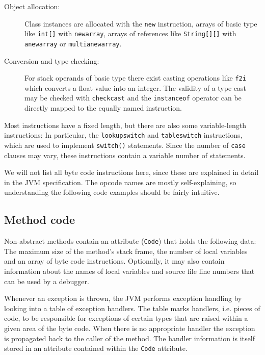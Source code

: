 \documentclass[12pt,twoside]{article}
\begin{document}
\begin{description}
\item[Object  allocation:]  Class  instances  are allocated  with  the
\texttt{new}  instruction, arrays  of basic  type  like \texttt{int[]}
with \texttt{newarray}, arrays  of references like \texttt{String[][]}
with \texttt{anewarray} or \texttt{multianewarray}.

\item[Conversion and type checking:]  For stack operands of basic type
there  exist casting  operations  like \texttt{f2i}  which converts  a
float  value into  an integer.   The validity  of a  type cast  may be
checked with  \texttt{checkcast} and the  \texttt{instanceof} operator
can be directly mapped to the equally named instruction.
\end{description}

Most  instructions  have a  fixed  length,  but  there are  also  some
variable-length instructions: In particular, the \texttt{lookupswitch}
and  \texttt{tableswitch} instructions,  which are  used  to implement
\texttt{switch()}  statements.   Since  the  number  of  \texttt{case}
clauses  may vary,  these instructions  contain a  variable  number of
statements.

We  will not list  all byte  code instructions  here, since  these are
explained in  detail in the  JVM specification.  The opcode  names are
mostly self-explaining,  so understanding the  following code examples
should be fairly intuitive.

\subsection{Method code}\label{sec:code2}

Non-abstract methods  contain an attribute  (\texttt{Code}) that holds
the following data: The maximum  size of the method's stack frame, the
number   of   local   variables    and   an   array   of   byte   code
instructions. Optionally,  it may  also contain information  about the
names of local variables and source file line numbers that can be used
by a debugger.

Whenever  an exception is thrown, the  JVM performs exception handling
by looking   into a  table  of exception  handlers.   The table  marks
handlers, i.e.  pieces  of code, to  be responsible for  exceptions of
certain types  that  are raised   within a  given  area  of  the  byte
code. When there is no appropriate handler the exception is propagated
back to the caller of the method. The handler information is itself
stored in an attribute contained within the \texttt{Code} attribute.
\end{document}
